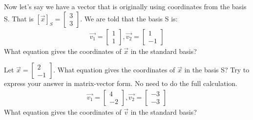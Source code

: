 \begin{enumerate}
  \qitem Now let's say we have a vector that is originally using coordinates from the basis S. 
  That is $[\vec{x}]_S = \begin{bmatrix} 3 \\ 3 \end{bmatrix}.$ We are told that the basis S is:
  \begin{gather*}
    \vec{v_1} =
    \begin{bmatrix}
      1 \\
      1
    \end{bmatrix},
    \vec{v_2} = \begin{bmatrix}
      1 \\
      -1
    \end{bmatrix}
  \end{gather*}
  What equation gives the coordinates of $\vec{x}$ in the standard basis?


  \qitem Let $\vec{x} = \begin{bmatrix} 2 \\ -1 \end{bmatrix}$. What equation gives the coordinates of $\vec{x}$ in the basis S? 
  Try to express your answer in matrix-vector form. No need to do the full calculation.
  \begin{gather*}
    \vec{v_1} =
    \begin{bmatrix}
      4 \\
      -2
    \end{bmatrix},
    \vec{v_2} = \begin{bmatrix}
      -3 \\
      -3
    \end{bmatrix}
  \end{gather*}
  What equation gives the coordinates of $\vec{v}$ in the standard basis?


\end{enumerate}
